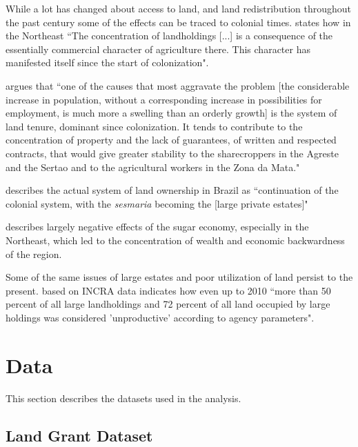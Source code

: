\documentclass{article}
\begin{document}
While a lot has changed about access to land, and land redistribution throughout the past century some of the effects can be traced to colonial times.
\textcite[p.~36]{De_Oliveira_Andrade1980-xz} states how in the Northeast 
``The concentration of landholdings [...] is a consequence of the essentially commercial character of agriculture there. This character has manifested itself since the start of colonization". 

\textcite[p.~34-35]{De_Oliveira_Andrade1980-xz} argues that 
``one of the causes that most aggravate the problem [the considerable increase in population, without a corresponding increase in possibilities for employment, is much more a swelling than an orderly growth] is the system of land tenure, dominant since colonization. It tends to contribute to the concentration of property and the lack of guarantees, of written and respected contracts, that would give greater stability to the sharecroppers in the Agreste and the Sertao and to the agricultural workers in the Zona da Mata."

\textcite[p.~18]{Andrade1980-zd} describes the actual system of land ownership in Brazil as ``continuation of the colonial system, with the \textit{sesmaria} becoming the [large private estates]"

\textcite[p.~16]{Baer2014-gh} describes largely negative effects of the sugar economy, especially in the Northeast, which led to the concentration of wealth and economic backwardness of the region.

Some of the same issues of large estates and poor utilization of land persist to the present. \textcite{Carlson2019-mk} based on INCRA data indicates how even up to 2010 ``more than 50 percent of all large landholdings and 72 percent of all land occupied by large holdings was considered 'unproductive' according to agency parameters".

\section{Data}
\label{sec:data}

This section describes the datasets used in the analysis.

\subsection{Land Grant Dataset}
\end{document}
